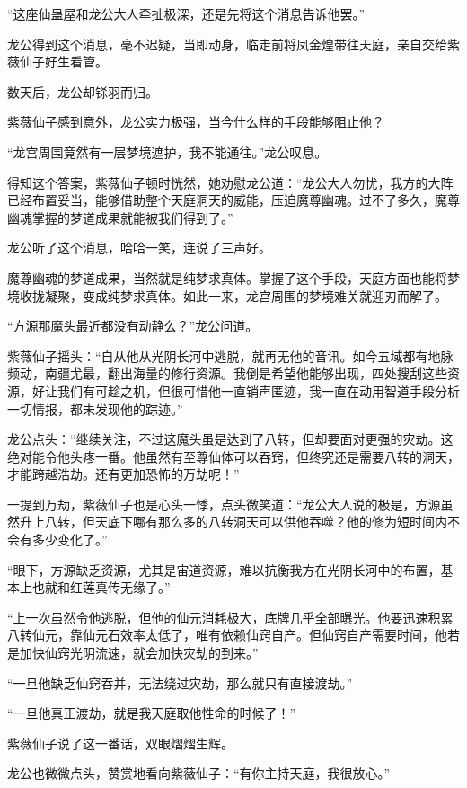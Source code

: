 \begin{this_body}
“这座仙蛊屋和龙公大人牵扯极深，还是先将这个消息告诉他罢。”

龙公得到这个消息，毫不迟疑，当即动身，临走前将凤金煌带往天庭，亲自交给紫薇仙子好生看管。

数天后，龙公却铩羽而归。

紫薇仙子感到意外，龙公实力极强，当今什么样的手段能够阻止他？

“龙宫周围竟然有一层梦境遮护，我不能通往。”龙公叹息。

得知这个答案，紫薇仙子顿时恍然，她劝慰龙公道：“龙公大人勿忧，我方的大阵已经布置妥当，能够借助整个天庭洞天的威能，压迫魔尊幽魂。过不了多久，魔尊幽魂掌握的梦道成果就能被我们得到了。”

龙公听了这个消息，哈哈一笑，连说了三声好。

魔尊幽魂的梦道成果，当然就是纯梦求真体。掌握了这个手段，天庭方面也能将梦境收拢凝聚，变成纯梦求真体。如此一来，龙宫周围的梦境难关就迎刃而解了。

“方源那魔头最近都没有动静么？”龙公问道。

紫薇仙子摇头：“自从他从光阴长河中逃脱，就再无他的音讯。如今五域都有地脉频动，南疆尤最，翻出海量的修行资源。我倒是希望他能够出现，四处搜刮这些资源，好让我们有可趁之机，但很可惜他一直销声匿迹，我一直在动用智道手段分析一切情报，都未发现他的踪迹。”

龙公点头：“继续关注，不过这魔头虽是达到了八转，但却要面对更强的灾劫。这绝对能令他头疼一番。他虽然有至尊仙体可以吞窍，但终究还是需要八转的洞天，才能跨越浩劫。还有更加恐怖的万劫呢！”

一提到万劫，紫薇仙子也是心头一悸，点头微笑道：“龙公大人说的极是，方源虽然升上八转，但天底下哪有那么多的八转洞天可以供他吞噬？他的修为短时间内不会有多少变化了。”

“眼下，方源缺乏资源，尤其是宙道资源，难以抗衡我方在光阴长河中的布置，基本上也就和红莲真传无缘了。”

“上一次虽然令他逃脱，但他的仙元消耗极大，底牌几乎全部曝光。他要迅速积累八转仙元，靠仙元石效率太低了，唯有依赖仙窍自产。但仙窍自产需要时间，他若是加快仙窍光阴流速，就会加快灾劫的到来。”

“一旦他缺乏仙窍吞并，无法绕过灾劫，那么就只有直接渡劫。”

“一旦他真正渡劫，就是我天庭取他性命的时候了！”

紫薇仙子说了这一番话，双眼熠熠生辉。

龙公也微微点头，赞赏地看向紫薇仙子：“有你主持天庭，我很放心。”

\end{this_body}

